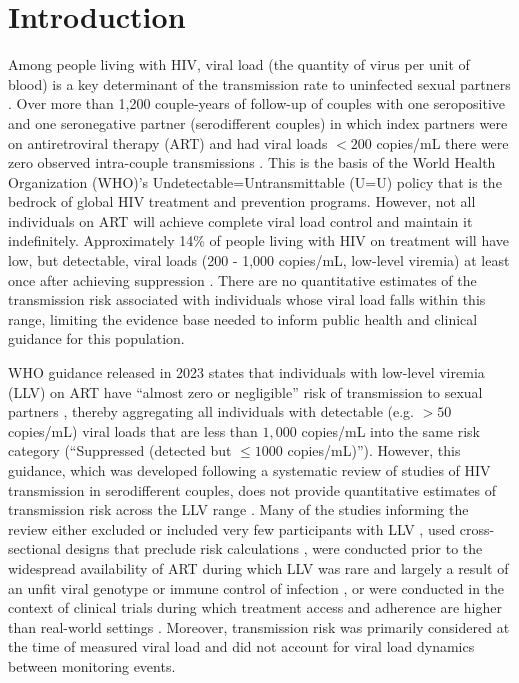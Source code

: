 \documentclass{article}[11pt]
\begin{document}
\section*{Introduction}
Among people living with HIV, viral load (the quantity of virus per unit of blood) is a key determinant of the transmission rate to uninfected sexual partners \cite{fraser2007, blanquart2016}. Over more than 1,200 couple-years of follow-up of couples with one seropositive and one seronegative partner (serodifferent couples) in which index partners were on antiretroviral therapy (ART) and had viral loads $<200$ copies/mL there were zero observed intra-couple transmissions \cite{rodger2016}. This is the basis of the World Health Organization (WHO)'s Undetectable=Untransmittable (U=U) policy that is the bedrock of global HIV treatment and prevention programs. However, not all individuals on ART will achieve complete viral load control and maintain it indefinitely. Approximately 14\% of people living with HIV on treatment will have low, but detectable, viral loads (200 - 1,000 copies/mL, low-level viremia) at least once after achieving suppression \cite{zhao2025}. There are no quantitative estimates of the transmission risk associated with individuals whose viral load falls within this range, limiting the evidence base needed to inform public health and clinical guidance for  this population. 

WHO guidance released in 2023 states that individuals with low-level viremia (LLV) on ART have ``almost zero or negligible'' risk of transmission to sexual partners \cite{who2023}, thereby aggregating all individuals with detectable (e.g. $>50$ copies/mL) viral loads that are less than $1,000$ copies/mL into the same risk category (``Suppressed (detected but $\leq1000$ copies/mL)'').  However, this guidance, which was developed following a systematic review of studies of HIV transmission  in serodifferent couples, does not provide quantitative estimates of transmission risk across the LLV range \cite{Zikmund-Fishe2025}.  Many of the studies informing the review either excluded or included very few participants with LLV \cite{rodger2016, rodger2019, fideli2001, bavinton2018}, used cross-sectional designs that preclude risk calculations \cite{fideli2001, tovanabutra2002}, were conducted prior to the widespread availability of ART \cite{fideli2001, quinn2000, tovanabutra2002} during which LLV was rare and largely a result of an unfit viral genotype or immune control of infection \cite{Yue2013}, or were conducted in the context of clinical trials during which treatment access and adherence are higher than real-world settings \cite{cohen2016, mujugira2016}. Moreover, transmission risk was primarily considered at the time of measured viral load and did not account for viral load dynamics between monitoring events. 
\end{document}
